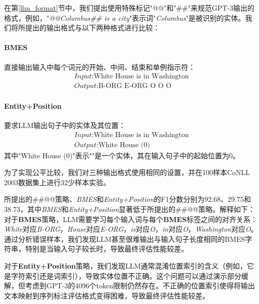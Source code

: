 \documentclass[supercite]{Experimental_Report}
\theoremstyle{definition}
\begin{document}
在第\ref{llm_format}节中，我们提出使用特殊标记"@@"和"\#\#"来规范GPT-3输出的格式，例如，"\textit{@@Columbus\#\# is a city}"表示词"\textit{Columbus}"是被识别的实体。我们将所提出的输出格式与以下两种格式进行比较：

\paragraph{BMES}直接输出输入中每个词元的开始、中间、结束和单例指示符：
\begin{equation}
\nonumber
    \begin{aligned}
      \textit{Input}\text{:White House is in Washington}\\
      \textit{Output}\text{:B-ORG E-ORG O O O}
    \end{aligned}
\end{equation}

\paragraph{Entity+Position}要求LLM输出句子中的实体及其位置：
\begin{equation}
\nonumber
    \begin{aligned}
      \textit{Input}\text{:White House is in Washington}\\
      \textit{Output}\text{:White House (0)}
    \end{aligned}
\end{equation}
其中"White House (0)"表示""是一个实体，其在输入句子中的起始位置为0。

为了实现公平比较，我们对三种输出格式使用相同的设置，并在100样本CoNLL 2003数据集上进行32少样本实验。

所提出的\#\#@@策略、{\it BMES}和{\it Entity+Position}的F1分数分别为92.68、29.75和38.73，其中{\it BMES}和{\it Entity+Position}显著低于所提出的\#\#@@策略。解释如下：对于\textbf{BMES}策略，LLM需要学习每个输入词与每个\textbf{BMES}标签之间的对齐关系：\textit{White}对应\textit{B-ORG}，\textit{House}对应\textit{E-ORG}，\textit{is}对应\textit{O}，\textit{in}对应\textit{O}，\textit{Washington}对应\textit{O}。通过分析错误样本，我们发现LLM甚至很难输出与输入句子长度相同的BMES字符串，特别是当输入句子较长时，导致最终评估性能较差。

对于\textbf{Entity+Position}策略，我们发现LLM通常混淆位置索引的含义（例如，它是字符索引还是词索引），导致实体位置不正确。这个问题可以通过演示部分缓解，但考虑到GPT-3的4096个token限制仍然存在。不正确的位置索引使得将输出文本映射到序列标注评估格式变得困难，导致最终评估性能较差。
\end{document}
